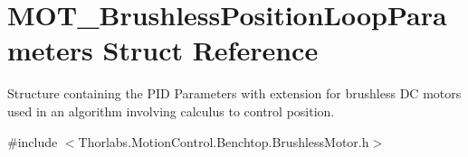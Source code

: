 \hypertarget{struct_m_o_t___brushless_position_loop_parameters}{}\section{M\+O\+T\+\_\+\+Brushless\+Position\+Loop\+Parameters Struct Reference}
\label{struct_m_o_t___brushless_position_loop_parameters}


Structure containing the P\+ID Parameters with extension for brushless DC motors used in an algorithm involving calculus to control position.  




{\ttfamily \#include $<$Thorlabs.\+Motion\+Control.\+Benchtop.\+Brushless\+Motor.\+h$>$}


